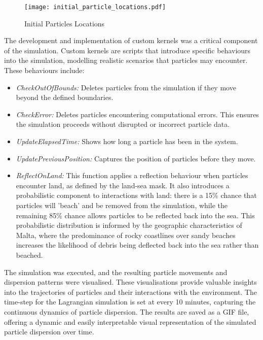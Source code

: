 \begin{figure}[htbp]
    \centering
    \texttt{[image: initial\_particle\_locations.pdf]}
    \caption[Short sample caption.]{Initial Particles Locations\label{fig_3.2}}
\end{figure}

The development and implementation of custom kernels was a critical component of the simulation. Custom kernels are scripts that introduce specific behaviours into the simulation, modelling realistic scenarios that particles may encounter. These behaviours include:

\begin{itemize}
    \item \textit{CheckOutOfBounds:} Deletes particles from the simulation if they move beyond the defined boundaries.
    \item \textit{CheckError:} Deletes particles encountering computational errors. This ensures the simulation proceeds without disrupted or incorrect particle data.
    \item \textit{UpdateElapsedTime:} Shows how long a particle has been in the system.
    \item \textit{UpdatePreviousPosition:} Captures the position of particles before they move.
    \item \textit{ReflectOnLand:} This function applies a reflection behaviour when particles encounter land, as defined by the land-sea mask. It also introduces a probabilistic component to interactions with land: there is a 15\% chance that particles will 'beach' and be removed from the simulation, while the remaining 85\% chance allows particles to be reflected back into the sea. This probabilistic distribution is informed by the geographic characteristics of Malta, where the predominance of rocky coastlines over sandy beaches increases the likelihood of debris being deflected back into the sea rather than beached.
\end{itemize}

The simulation was executed, and the resulting particle movements and dispersion patterns were visualised. These visualisations provide valuable insights into the trajectories of particles and their interactions with the environment. The time-step for the Lagrangian simulation is set at every 10 minutes, capturing the continuous dynamics of particle dispersion. The results are saved as a GIF file, offering a dynamic and easily interpretable visual representation of the simulated particle dispersion over time.

